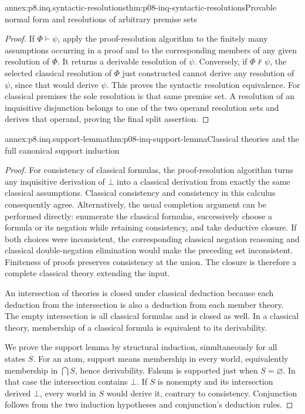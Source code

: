 \begin{annexitem}{annex:p8.inq.syntactic-resolutions}{thm:p08-inq-syntactic-resolutions}{Provable normal form and resolutions of arbitrary premise sets}
\begin{proof}
If \(\Phi\vdash\psi\), apply the proof-resolution algorithm to the
finitely many assumptions occurring in a proof and to the corresponding
members of any given resolution of \(\Phi\). It returns a derivable
resolution of \(\psi\). Conversely, if \(\Phi\not\vdash\psi\),
the selected classical resolution of \(\Phi\) just constructed cannot
derive any resolution of \(\psi\), since that would derive \(\psi\).
This proves the syntactic resolution equivalence. For classical premises
the sole resolution is that same premise set. A resolution of an inquisitive
disjunction belongs to one of the two operand resolution sets and derives
that operand, proving the final split assertion.
\end{proof}
\end{annexitem}

\begin{annexitem}{annex:p8.inq.support-lemma}{thm:p08-inq-support-lemma}{Classical theories and the full canonical support induction}
\begin{proof}
For consistency of classical formulas, the proof-resolution algorithm
turns any inquisitive derivation of \(\bot\) into a classical derivation
from exactly the same classical assumptions. Classical consistency and
consistency in this calculus consequently agree. Alternatively, the
usual completion argument can be performed directly: enumerate the
classical formulas, successively choose a formula or its negation while
retaining consistency, and take deductive closure. If both choices
were inconsistent, the corresponding classical negation reasoning and
classical double-negation elimination would make the preceding set
inconsistent. Finiteness of proofs preserves consistency at the union.
The closure is therefore a complete classical theory extending the input.

An intersection of theories is closed under classical deduction because
each deduction from the intersection is also a deduction from each
member theory. The empty intersection is all classical formulas and
is closed as well. In a classical theory, membership of a classical
formula is equivalent to its derivability.

We prove the support lemma by structural induction, simultaneously for
all states \(S\). For an atom, support means membership in every world,
equivalently membership in \(\bigcap S\), hence derivability. Falsum
is supported just when \(S=\varnothing\). In that case the intersection
contains \(\bot\). If \(S\) is nonempty and its intersection derived
\(\bot\), every world in \(S\) would derive it, contrary to consistency.
Conjunction follows from the two induction hypotheses and conjunction's
deduction rules.


\end{proof}
\end{annexitem}
